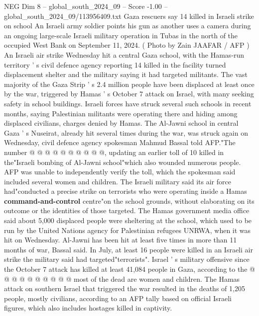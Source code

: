 \begin{textsample}{NEG Dim 8 – global\_south\_2024\_09 – Score -1.00 – global\_south\_2024\_09/113956409.txt}  \label{ex:f8_neg_208}
Gaza rescuers say 14 killed in Israeli strike on school An Israeli army soldier points his gun as another uses a camera during an ongoing large-scale Israeli military operation in Tubas in the north of the occupied West Bank on September 11, 2024. ( Photo by Zain JAAFAR / AFP ) An Israeli air strike Wednesday hit a central Gaza school, with the Hamas-run territory ' s civil defence agency reporting 14 killed in the facility turned displacement shelter and the military saying it had targeted militants.
The vast majority of the Gaza Strip ' s 2.4 million people have been displaced at least once by the war, triggered by Hamas ' s October 7 attack on Israel, with many seeking safety in school buildings.
Israeli forces have struck several such schools in recent months, saying Palestinian militants were operating there and hiding among displaced civilians, charges denied by Hamas.
The Al-Jawni school in central Gaza ' s Nuseirat, already hit several times during the war, was struck again on Wednesday, civil defence agency spokesman Mahmud Bassal told AFP."The number @ @ @ @ @ @ @ @ @ @, updating an earlier toll of 10 killed in the"Israeli bombing of Al-Jawni school"which also wounded numerous people.
AFP was unable to independently verify the toll, which the spokesman said included several women and children.
The Israeli military said its air force had"conducted a precise strike on terrorists who were operating inside a Hamas \textbf{command-and-control} centre"on the school grounds, without elaborating on its outcome or the identities of those targeted.
The Hamas government media office said about 5,000 displaced people were sheltering at the school, which used to be run by the United Nations agency for Palestinian refugees UNRWA, when it was hit on Wednesday.
Al-Jawni has been hit at least five times in more than 11 months of war, Bassal said.
In July, at least 16 people were killed in an Israeli air strike the military said had targeted"terrorists".
Israel ' s military offensive since the October 7 attack has killed at least 41,084 people in Gaza, according to the @ @ @ @ @ @ @ @ @ @ most of the dead are women and children.
The Hamas attack on southern Israel that triggered the war resulted in the deaths of 1,205 people, mostly civilians, according to an AFP tally based on official Israeli figures, which also includes hostages killed in captivity.

\end{textsample}

